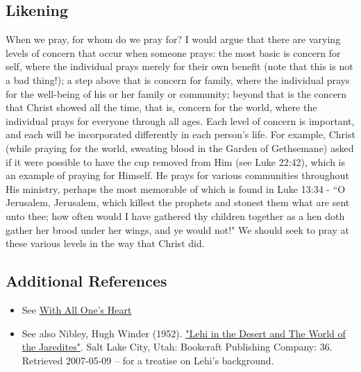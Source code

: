 \documentclass[12pt]{report}
\begin{document}
\subsection{Likening\label{1Nephi1:5:likening}}
When we pray, for whom do we pray for?  I would argue that there are varying levels of concern that occur when someone prays: the most basic is concern for self, where the individual prays merely for their own benefit (note that this is not a bad thing!); a step above that is concern for family, where the individual prays for the well-being of his or her family or community; beyond that is the concern that Christ showed all the time, that is, concern for the world, where the individual prays for everyone through all ages.  Each level of concern is important, and each will be incorporated differently in each person's life.  For example, Christ (while praying for the world, sweating blood in the Garden of Gethsemane) asked if it were possible to have the cup removed from Him (see Luke 22:42), which is an example of praying for Himself.  He prays for various communities throughout His ministry, perhaps the most memorable of which is found in Luke 13:34 - ``O Jerusalem, Jerusalem, which killest the prophets and stonest them what are sent unto thee; how often would I have gathered thy children together as a hen doth gather her brood under her wings, and ye would not!" We should seek to pray at these various levels in the way that Christ did.

\subsection{Additional References\label{1Nephi1:5:references}}
\begin{itemize}
\item See \href{http://idioms.thefreedictionary.com/with+all+one%27s+heart}{With All One's Heart}
\item See also Nibley, Hugh Winder (1952). \href{http://www.boap.org/LDS/Hugh-Nibley/Lehi_in_the_Desert_part_1.html}{"Lehi in the Desert and The World of the Jaredites"}. Salt Lake City, Utah: Bookcraft Publishing Company: 36. Retrieved 2007-05-09 -- for a treatise on Lehi's background.
\end{itemize}

\end{document}
